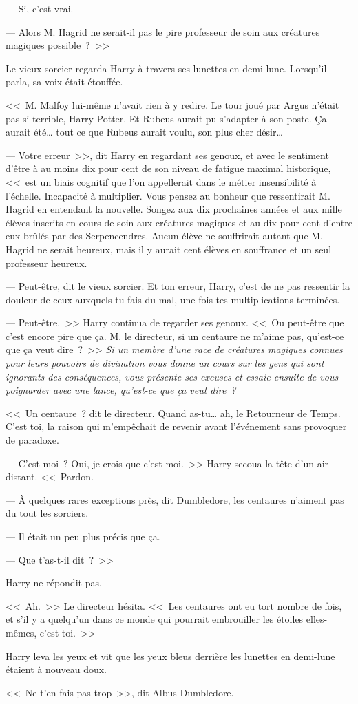 --- Si, c'est vrai.

--- Alors M. Hagrid ne serait-il pas le pire professeur de soin aux créatures magiques possible~?~>>

Le vieux sorcier regarda Harry à travers ses lunettes en demi-lune. Lorsqu'il parla, sa voix était étouffée.

<<~M. Malfoy lui-même n'avait rien à y redire. Le tour joué par Argus n'était pas si terrible, Harry Potter. Et Rubeus aurait pu s'adapter à son poste. Ça aurait été… tout ce que Rubeus aurait voulu, son plus cher désir…

--- Votre erreur~>>, dit Harry en regardant ses genoux, et avec le sentiment d'être à au moins dix pour cent de son niveau de fatigue maximal historique, <<~est un biais cognitif que l'on appellerait dans le métier insensibilité à l'échelle. Incapacité à multiplier. Vous pensez au bonheur que ressentirait M. Hagrid en entendant la nouvelle. Songez aux dix prochaines années et aux mille élèves inscrits en cours de soin aux créatures magiques et au dix pour cent d'entre eux brûlés par des Serpencendres. Aucun élève ne souffrirait autant que M. Hagrid ne serait heureux, mais il y aurait cent élèves en souffrance et un seul professeur heureux.

--- Peut-être, dit le vieux sorcier. Et ton erreur, Harry, c'est de ne pas ressentir la douleur de ceux auxquels tu fais du mal, une fois tes multiplications terminées.

--- Peut-être.~>> Harry continua de regarder ses genoux. <<~Ou peut-être que c'est encore pire que ça. M. le directeur, si un centaure ne m'aime pas, qu'est-ce que ça veut dire~?~>> \emph{Si un membre d'une race de créatures magiques connues pour leurs pouvoirs de divination vous donne un cours sur les gens qui sont ignorants des conséquences, vous présente ses excuses et essaie ensuite de vous poignarder avec une lance, qu'est-ce que ça veut dire~?}

<<~Un centaure~? dit le directeur. Quand as-tu… ah, le Retourneur de Temps. C'est toi, la raison qui m'empêchait de revenir avant l'événement sans provoquer de paradoxe.

--- C'est moi~? Oui, je crois que c'est moi.~>> Harry secoua la tête d'un air distant. <<~Pardon.

--- À quelques rares exceptions près, dit Dumbledore, les centaures n'aiment pas du tout les sorciers.

--- Il était un peu plus précis que ça.

--- Que t'as-t-il dit~?~>>

Harry ne répondit pas.

<<~Ah.~>> Le directeur hésita. <<~Les centaures ont eu tort nombre de fois, et s'il y a quelqu'un dans ce monde qui pourrait embrouiller les étoiles elles-mêmes, c'est toi.~>>

Harry leva les yeux et vit que les yeux bleus derrière les lunettes en demi-lune étaient à nouveau doux.

<<~Ne t'en fais pas trop~>>, dit Albus Dumbledore.  

